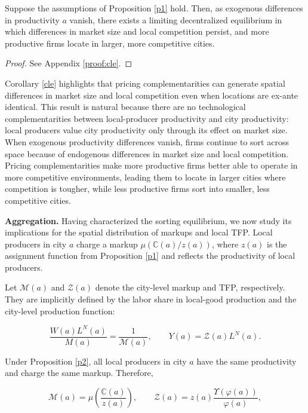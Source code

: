\begin{cor}\label{cle}
    Suppose the assumptions of Proposition \ref{p1} hold. Then, as exogenous differences in productivity $a$ vanish, there exists a limiting decentralized equilibrium in which differences in market size and local competition persist, and more productive firms locate in larger, more competitive cities.
\end{cor}

\begin{proof}
	See Appendix \ref{proof:cle}.
\end{proof}

Corollary \ref{cle} highlights that pricing complementarities can generate spatial differences in market size and local competition even when locations are ex-ante identical. This result is natural because there are no technological complementarities between local-producer productivity and city productivity: local producers value city productivity only through its effect on market size. When exogenous productivity differences vanish, firms continue to sort across space because of endogenous differences in market size and local competition. Pricing complementarities make more productive firms better able to operate in more competitive environments, leading them to locate in larger cities where competition is tougher, while less productive firms sort into smaller, less competitive cities.

\textbf{Aggregation.} Having characterized the sorting equilibrium, we now study its implications for the spatial distribution of markups and local TFP. Local producers in city $a$ charge a markup $\mu\left(\mathbb{C}(a)/z(a)\right)$, where $z(a)$ is the assignment function from Proposition \ref{p1} and reflects the productivity of local producers.

Let $\mathcal{M}(a)$ and $\mathcal{Z}(a)$ denote the city-level markup and TFP, respectively. They are implicitly defined by the labor share in local-good production and the city-level production function:

\begin{equation}\label{eq:aggObjDef}
\frac{W(a) L^N(a)}{M(a)} = \frac{1}{\mathcal{M}(a)}, \qquad Y(a) = \mathcal{Z}(a) L^N(a).
\end{equation}

Under Proposition \ref{p2}, all local producers in city $a$ have the same productivity and charge the same markup. Therefore,

\begin{equation}\label{eq:MuTFP}
\mathcal{M}(a) = \mu\left(\frac{\mathbb{C}(a)}{z(a)}\right), \qquad \mathcal{Z}(a) = z(a) \frac{\Upsilon\left(\varphi(a)\right)}{\varphi(a)}, 
\end{equation}

